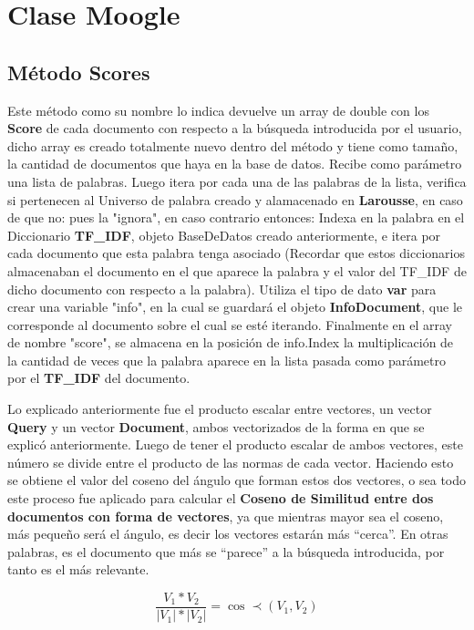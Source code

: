 \documentclass[10pt,a4paper]{article}
\begin{document}
\section{Clase Moogle}
\subsection{M\'etodo Scores}
\setlength{\parindent}{1em} Este m\'etodo como su nombre lo indica devuelve un array de double con los \textbf{Score} de cada documento con respecto a la b\'usqueda introducida por el usuario, dicho array es creado totalmente nuevo dentro del m\'etodo y tiene como tama\~no, la cantidad de documentos que haya en la base de datos. Recibe como par\'ametro una lista de palabras. Luego itera por cada una de las palabras de la lista, verifica si pertenecen al Universo de palabra creado y alamacenado en \textbf{Larousse}, en caso de que no: pues la "ignora", en caso contrario entonces: Indexa en la palabra en el Diccionario \textbf{TF\_IDF}, objeto BaseDeDatos creado anteriormente, e itera por cada documento que esta palabra tenga asociado (Recordar que estos diccionarios almacenaban el documento en el que aparece la palabra y el valor del TF\_IDF de dicho documento con respecto a la palabra). Utiliza el tipo de dato \textbf{var} para crear una variable "info", en la cual se guardar\'a el objeto \textbf{InfoDocument}, que le corresponde al documento sobre el cual se est\'e iterando. Finalmente en el array de nombre "score", se almacena en la posici\'on de info.Index la multiplicaci\'on de la cantidad de veces que la palabra aparece en la lista pasada como par\'ametro por el \textbf{TF\_IDF} del documento. 

\setlength{\parindent}{1em} Lo explicado anteriormente fue el producto escalar entre vectores, un vector \textbf{Query} y un vector \textbf{Document}, ambos vectorizados de la forma en que se explic\'o anteriormente. Luego de tener el producto escalar de ambos vectores, este n\'umero se divide entre el producto de las normas de cada vector. Haciendo esto se obtiene el valor del coseno del \'angulo que forman estos dos vectores, o sea todo este proceso fue aplicado para calcular el \textbf{Coseno de Similitud entre dos documentos con forma de vectores}, ya que mientras mayor sea el coseno, m\'as peque\~no ser\'a el \'angulo, es decir los vectores estar\'an m\'as ``cerca''. En otras palabras, es el documento que m\'as se ``parece'' a la b\'usqueda introducida, por tanto es el m\'as relevante. 

{\LARGE \begin{equation*}
\dfrac{V_1 * V_2}{|V_1| * |V_2|} = \cos \prec(V_1,V_2)
\end{equation*}}
\end{document}
